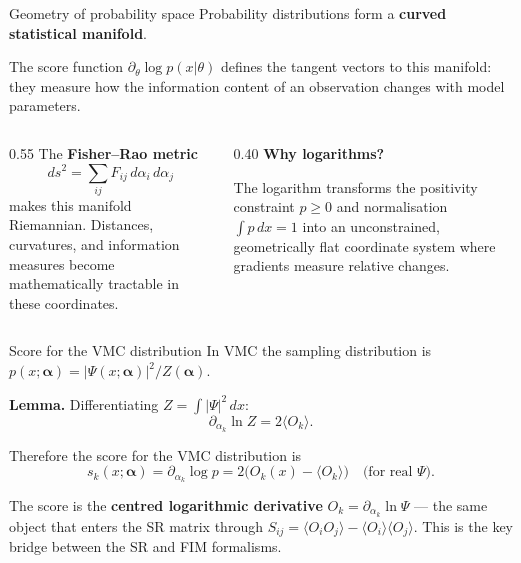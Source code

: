 \documentclass[aspectratio=169]{beamer}
\begin{document}
\begin{frame}{Geometry of probability space}
Probability distributions form a \textbf{curved statistical manifold}.

\medskip

The score function \(\partial_\theta\log p(x|\theta)\) defines
the tangent vectors to this manifold: they measure how the
information content of an observation changes with model parameters.

\medskip

\begin{columns}[T]
\begin{column}{0.55\textwidth}
The \textbf{Fisher--Rao metric}
\[
ds^2=\sum_{ij}F_{ij}\,d\alpha_i\,d\alpha_j
\]
makes this manifold Riemannian.
Distances, curvatures, and information measures become
mathematically tractable in these coordinates.
\end{column}
\begin{column}{0.40\textwidth}
\textbf{Why logarithms?}

The logarithm transforms the positivity
constraint \(p\geq0\) and normalisation
\(\int p\,dx=1\) into an unconstrained,
geometrically flat coordinate system
where gradients measure relative changes.
\end{column}
\end{columns}
\end{frame}


\begin{frame}{Score for the VMC distribution}
In VMC the sampling distribution is
\(p(x;\bm{\alpha})=|\Psi(x;\bm{\alpha})|^2/Z(\bm{\alpha})\).

\medskip

\textbf{Lemma.}  Differentiating \(Z=\int|\Psi|^2\,dx\):
\[
\partial_{\alpha_k}\ln Z=2\langle O_k\rangle.
\]

Therefore the score for the VMC distribution is
\[
s_k(x;\bm{\alpha})
=\partial_{\alpha_k}\log p
=2\bigl(O_k(x)-\langle O_k\rangle\bigr)
\quad\text{(for real }\Psi\text{)}.
\]

The score is the \textbf{centred logarithmic derivative}
\(O_k=\partial_{\alpha_k}\ln\Psi\) — the same object that enters
the SR matrix through \(S_{ij}=\langle O_iO_j\rangle-\langle O_i\rangle\langle O_j\rangle\).
This is the key bridge between the SR and FIM formalisms.
\end{frame}
\end{document}
